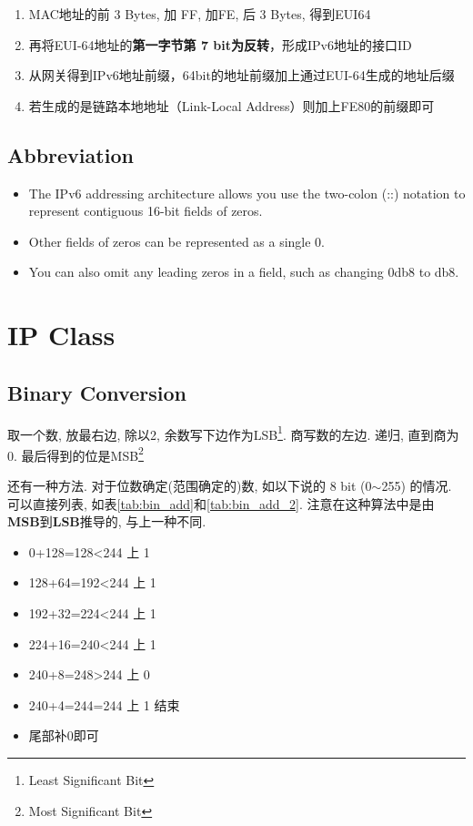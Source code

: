 \documentclass[a4paper]{report}
\begin{document}
\begin{enumerate}
  \item MAC地址的前 3 Bytes, 加 FF, 加FE, 后 3 Bytes, 得到EUI64
  \item 再将EUI-64地址的\textbf{第一字节第 7 bit为反转}，形成IPv6地址的接口ID
  \item 从网关得到IPv6地址前缀，64bit的地址前缀加上通过EUI-64生成的地址后缀
  \item 若生成的是链路本地地址（Link-Local Address）则加上FE80的前缀即可
\end{enumerate}



\subsection{Abbreviation}
\begin{itemize}
  \item The IPv6 addressing architecture allows you use the two-colon (::) notation to represent contiguous 16-bit fields of zeros. 
  \item Other fields of zeros can be represented as a single 0.
  \item You can also omit any leading zeros in a field, such as changing 0db8 to db8.
\end{itemize}

\section{IP Class}
\subsection{Binary Conversion}
取一个数, 放最右边, 除以2, 余数写下边作为LSB\footnote{Least Significant Bit}. 商写数的左边. 递归, 直到商为0. 最后得到的位是MSB\footnote{Most Significant Bit}

还有一种方法. 对于位数确定(范围确定的)数, 如以下说的 8 bit (0$\sim$255) 的情况. 可以直接列表, 如表\ref{tab:bin_add}和\ref{tab:bin_add_2}. 注意在这种算法中是由\textbf{MSB}到\textbf{LSB}推导的, 与上一种不同. 
\begin{itemize}
  \item 0+128=128<244 上 1
  \item 128+64=192<244 上 1
  \item 192+32=224<244 上 1
  \item 224+16=240<244 上 1
  \item 240+8=248>244 上 0 
  \item 240+4=244=244 上 1 结束
  \item 尾部补0即可
\end{itemize}
\end{document}
